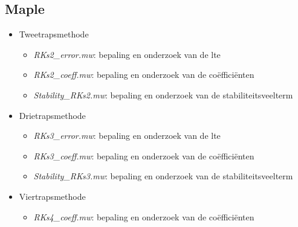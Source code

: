 \documentclass[12pt]{article}
\begin{document}
\subsection*{Maple}
\begin{itemize}
    \item Tweetrapsmethode
    \begin{itemize}
        \item \textit{RKs2\_error.mw}: bepaling en onderzoek van de lte
        \item \textit{RKs2\_coeff.mw}: bepaling en onderzoek van de coëfficiënten
        \item \textit{Stability\_RKs2.mw}: bepaling en onderzoek van de stabiliteitsveelterm
    \end{itemize}
    \item Drietrapsmethode
    \begin{itemize}
        \item \textit{RKs3\_error.mw}:  bepaling en onderzoek van de lte
        \item \textit{RKs3\_coeff.mw}: bepaling en onderzoek van de coëfficiënten
        \item \textit{Stability\_RKs3.mw}: bepaling en onderzoek van de stabiliteitsveelterm
    \end{itemize}
    \item Viertrapsmethode
    \begin{itemize}
        \item \textit{RKs4\_coeff.mw}: bepaling en onderzoek van de coëfficiënten
    \end{itemize}
\end{itemize}

\clearpage{\thispagestyle{empty}\cleardoublepage}\null\newpage
\end{document}
